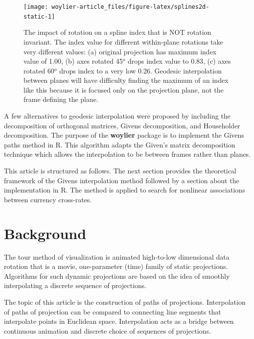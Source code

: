 \begin{Schunk}
\begin{figure}
\texttt{[image: woylier-article\_files/figure-latex/splines2d-static-1]} \caption[The impact of rotation on a spline index that is NOT rotation invariant]{The impact of rotation on a spline index that is NOT rotation invariant. The index value for different within-plane rotations take very different values: (a) original projection has maximum index value of 1.00, (b) axes rotated 45$^o$ drops index value to 0.83, (c) axes rotated 60$^o$ drops index to a very low 0.26. Geodesic interpolation between planes will have difficulty finding the maximum of an index like this because it is focused only on the projection plane, not the frame defining the plane.}\label{fig:splines2d-static}
\end{figure}
\end{Schunk}

A few alternatives to geodesic interpolation were proposed by
\citet{buja_cook_asimov_hurley_2005} including the decomposition of
orthogonal matrices, Givens decomposition, and Householder
decomposition. The purpose of the \textbf{woylier} package is to
implement the Givens paths method in R. This algorithm adapts the
Given's matrix decomposition technique which allows the interpolation to
be between frames rather than planes.

This article is structured as follows. The next section provides the
theoretical framework of the Givens interpolation method followed by a
section about the implementation in R. The method is applied to search
for nonlinear associations between currency cross-rates.

\hypertarget{background}{%
\section{Background}\label{background}}

The tour method of visualization is animated high-to-low dimensional
data rotation that is a movie, one-parameter (time) family of static
projections. Algorithms for such dynamic projections
\citet{buja_cook_asimov_hurley_2005} are based on the idea of smoothly
interpolating a discrete sequence of projections.

The topic of this article is the construction of paths of projections.
Interpolation of paths of projection can be compared to connecting line
segments that interpolate points in Euclidean space. Interpolation acts
as a bridge between continuous animation and discrete choice of
sequences of projections.

